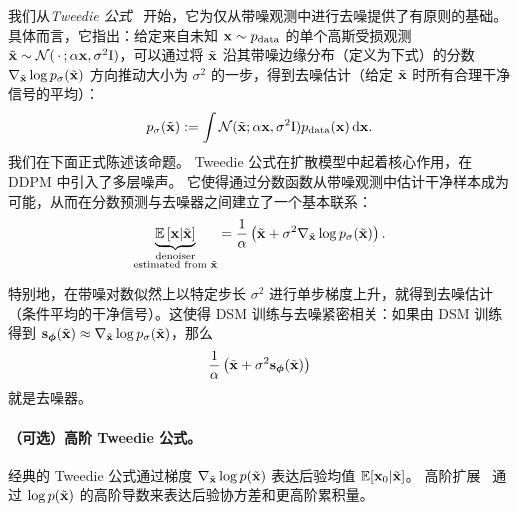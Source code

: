 我们从\emph{Tweedie 公式}~\citep{efron2011tweedie} 开始，它为仅从带噪观测中进行去噪提供了有原则的基础。
具体而言，它指出：给定来自未知 ${\mathbf{x}} \sim p_{\mathrm{data}}$ 的单个高斯受损观测 $\tilde{{\mathbf{x}}}\sim\mathcal N(\,\cdot\,;\alpha{\mathbf{x}},\sigma^2\mathrm{I})$，可以通过将 $\tilde{{\mathbf{x}}}$ 沿其带噪边缘分布（定义为下式）的分数
$\nabla_{\tilde{{\mathbf{x}}}}\log p_\sigma(\tilde{{\mathbf{x}}})$ 方向推动大小为 $\sigma^2$ 的一步，得到去噪估计（给定 $\tilde{{\mathbf{x}}}$ 时所有合理干净信号的平均）：
\[
p_\sigma(\tilde{{\mathbf{x}}}):= \int \mathcal{N}(\tilde{{\mathbf{x}}};\alpha {\mathbf{x}},\sigma^2\mathrm{I})p_{\mathrm{data}}({\mathbf{x}})\mathop{}\!\mathrm{d}{\mathbf{x}}.
\]
我们在下面正式陈述该命题。
Tweedie 公式在扩散模型中起着核心作用，在 DDPM 中引入了多层噪声。
它使得通过分数函数从带噪观测中估计干净样本成为可能，从而在分数预测与去噪器之间建立了一个基本联系：
\begin{equation*}
\underbrace{\mathbb{E} \left[{\mathbf{x}}|\tilde{{\mathbf{x}}}\right]}_{\substack{\text{denoiser}\\\text{estimated from }\tilde{{\mathbf{x}}}}}
= \frac{1}{\alpha}\left(\tilde{{\mathbf{x}}} + \sigma^2 \nabla_{\tilde{{\mathbf{x}}}} \log p_\sigma(\tilde{{\mathbf{x}}})\right).
\end{equation*}

特别地，在带噪对数似然上以特定步长 $\sigma^2$
进行单步梯度上升，就得到去噪估计（条件平均的干净信号）。这使得
DSM 训练与去噪紧密相关：如果由 DSM 训练得到
${\mathbf{s}}_{\bm{\phi}}(\tilde{{\mathbf{x}}})\approx
\nabla_{\tilde{{\mathbf{x}}}}\log p_\sigma(\tilde{{\mathbf{x}}})$，那么
\[
\frac{1}{\alpha}\left(\tilde{{\mathbf{x}}}+\sigma^2 {\mathbf{s}}_{\bm{\phi}}(\tilde{{\mathbf{x}}})\right)
\]
就是去噪器。

\paragraph{（可选）高阶 Tweedie 公式。} 经典的 Tweedie 公式通过梯度 $\nabla_{\tilde{{\mathbf{x}}}}\log p(\tilde{{\mathbf{x}}})$ 表达后验均值 $\mathbb{E}[{\mathbf{x}}_0|\tilde{{\mathbf{x}}}]$。
高阶扩展~\citep{meng2021estimating} 通过 $\log p(\tilde{{\mathbf{x}}})$ 的高阶导数来表达后验协方差和更高阶累积量。


